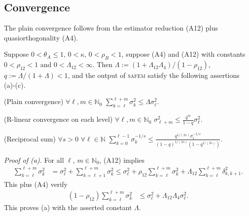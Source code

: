 \documentclass{siamltex1213}
\begin{document}
\subsection{Convergence}\label{ssec:conv}
The plain convergence follows from the estimator reduction (A12) plus quasiorthogonality (A4).
\begin{theorem}\label{th:conv}
Suppose $0<\theta_A\leq 1$, $0<\kappa$, $0<\rho_B<1$, suppose (A4) and 
(A12) with constants  $0<\rho_{12}<1$ and $0<{\ensuremath{\Lambda_{\mathrm{12}}}}<\infty$.
Then ${\ensuremath{\Lambda}}:=(1+{\ensuremath{\Lambda_{\mathrm{12}}}} {\ensuremath{\Lambda_{\mathrm{4}}}})/(1-\rho_{12})$,  $q:=\Lambda/(1+\Lambda)<1$,
and the output of {\textsc{safem}\xspace} satisfy the following assertions (a)-(c).
	\begin{alphenum}
		\item (Plain convergence) $ \forall \ell, m \in {\mathbb{N}_0}$ \quad
				$\displaystyle \sum_{k=\ell}^{\ell+m} \sigma_k^2 \leq {\ensuremath{\Lambda}} \sigma_\ell^2.$
		\item (R-linear convergence on each level)  $\forall \ell,m \in {\mathbb{N}_0}$ 
		\quad	$\displaystyle	\sigma_{\ell+m}^2 \leq \frac{q^m}{1-q} \sigma_\ell^2.$
	\item (Reciprocal sum) \label{lem:geomRow} $\forall s>0$ $\forall \ell\in \mathbb N$ 
		\quad 	$\displaystyle	\sum_{k=0}^{\ell-1} \sigma_k^{-1/s} \leq \frac{q^{1/(2s)} \sigma_\ell^{-1/s}}{(1-q)^{1/(2s)}(1-q^{1/(2s)})}.$
	\end{alphenum}
\end{theorem}
 \noindent\textit{Proof of (a).}
	For all $\ell$, $m \in {\mathbb{N}_0}$, (A12) implies
	\begin{align}\label{eq:A12imply}
		\sum_{k=\ell}^{\ell+m} \sigma_k^2 & = \sigma_\ell^2 + \sum_{k=\ell+1}^{\ell+m} \sigma_k^2
		\leq \sigma_\ell^2 +  \rho_{12}\sum_{k=\ell}^{\ell+m} \sigma_{k}^2  + {\ensuremath{\Lambda_{\mathrm{12}}}} \sum_{k=\ell}^{\ell+m}\delta^2_{k,k+1}.
		\end{align}
		This plus (A4) verify
		\begin{align*}
		 \left( 1- \rho_{12} \right)\sum_{k=\ell}^{\ell+m} \sigma_k^2& \leq \sigma_\ell^2 + {\ensuremath{\Lambda_{\mathrm{12}}}} {\ensuremath{\Lambda_{\mathrm{4}}}} \sigma_\ell^2 .
	\end{align*}
	This proves (a) with the asserted constant ${\ensuremath{\Lambda}}$.
	\qquad \endproof
\end{document}

